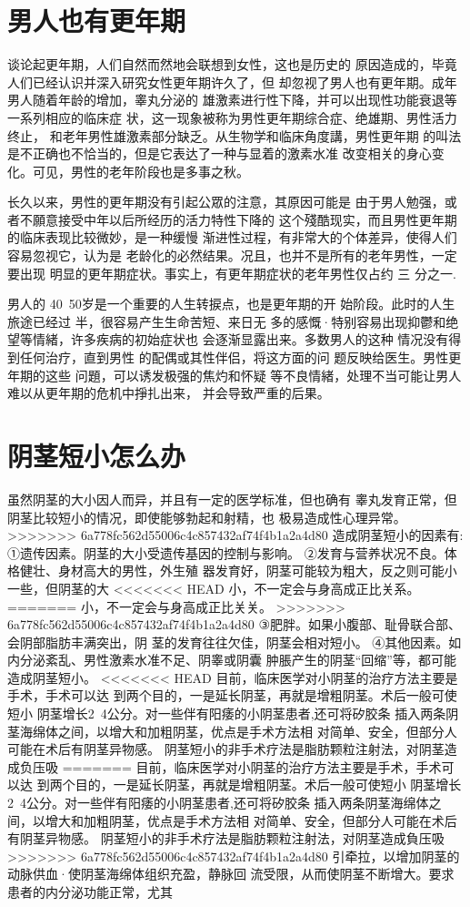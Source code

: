\documentclass[12pt,UTF8]{ctexbook}
\begin{document}
\section{男人也有更年期}

谈论起更年期，人们自然而然地会联想到女性，这也是历史的
原因造成的，毕竟人们已经认识并深入研究女性更年期许久了，但
却忽视了男人也有更年期。成年男人随着年龄的增加，睾丸分泌的
雄激素进行性下降，并可以出现性功能衰退等一系列相应的临床症
状，这一现象被称为男性更年期综合症、绝雄期、男性活力终止，
和老年男性雄激素部分缺乏。从生物学和临床角度講，男性更年期
的叫法是不正确也不恰当的，但是它表达了一种与显着的激素水准
改变相关的身心变化。可见，男性的老年阶段也是多事之秋。

长久以来，男性的更年期没有引起公眾的注意，其原因可能是
由于男人勉强，或者不願意接受中年以后所经历的活力特性下降的
这个殘酷现实，而且男性更年期的临床表现比较微妙，是一种缓慢
渐进性过程，有非常大的个体差异，使得人们容易忽视它，认为是
老龄化的必然结果。况且，也并不是所有的老年男性，一定要出现
明显的更年期症状。事实上，有更年期症状的老年男性仅占约 三
分之一.

男人的 40~50岁是一个重要的人生转捩点，也是更年期的开
始阶段。此时的人生旅途已经过
半，很容易产生生命苦短、来日无
多的感慨·特别容易出现抑鬱和绝
望等情緒，许多疾病的初始症状也
会逐渐显露出来。多数男人的这种
情况没有得到任何治疗，直到男性
的配偶或其性伴侣，将这方面的问
题反映给医生。男性更年期的这些
问題，可以诱发极强的焦灼和怀疑
等不良情緒，处理不当可能让男人
难以从更年期的危机中掙扎出来，
并会导致严重的后果。

\section{阴茎短小怎么办}

虽然阴茎的大小因人而异，并且有一定的医学标准，但也确有
睾丸发育正常，但阴茎比较短小的情况，即使能够勃起和射精，也
极易造成性心理异常。
>>>>>>> 6a778fc562d55006c4c857432af74f4b1a2a4d80
造成阴茎短小的因素有:
①遗传因素。阴茎的大小受遗传基因的控制与影响。
②发育与营养状况不良。体格健壮、身材高大的男性，外生殖
器发育好，阴茎可能较为粗大，反之则可能小一些，但阴茎的大
<<<<<<< HEAD
小，不一定会与身高成正比关系。
=======
小，不一定会与身高成正比关关。
>>>>>>> 6a778fc562d55006c4c857432af74f4b1a2a4d80
③肥胖。如果小腹部、耻骨联合部、会阴部脂肪丰满突出，阴
茎的发育往往欠佳，阴茎会相对短小。
④其他因素。如内分泌紊乱、男性激素水准不足、阴睾或阴囊
肿脹产生的阴茎“回缩”等，都可能造成阴茎短小。
<<<<<<< HEAD
目前，临床医学对小阴茎的治疗方法主要是手术，手术可以达
到两个目的，一是延长阴茎，再就是增粗阴茎。术后一般可使短小
阴茎增长2~4公分。对一些伴有阳痿的小阴茎患者,还可将矽胶条
插入两条阴茎海绵体之间，以增大和加粗阴茎，优点是手术方法相
对简单、安全，但部分人可能在术后有阴茎异物感。
阴茎短小的非手术疗法是脂肪颗粒注射法，对阴茎造成负压吸
=======
目前，临床医学对小阴茎的治疗方法主要是手术，手术可以达
到两个目的，一是延长阴茎，再就是增粗阴茎。术后一般可使短小
阴茎增长2~4公分。对一些伴有阳痿的小阴茎患者,还可将矽胶条
插入两条阴茎海绵体之间，以增大和加粗阴茎，优点是手术方法相
对简单、安全，但部分人可能在术后有阴茎异物感。
阴茎短小的非手术疗法是脂肪颗粒注射法，对阴茎造成負压吸
>>>>>>> 6a778fc562d55006c4c857432af74f4b1a2a4d80
引牵拉，以增加阴茎的动脉供血·使阴茎海绵体组织充盈，静脉回
流受限，从而使阴茎不断增大。要求患者的内分泌功能正常，尤其
\end{document}

